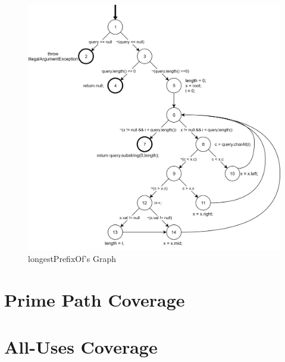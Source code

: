 \documentclass[12pt]{article}
\begin{document}
\begin{figure}[htb]
  	\centering
  	\includegraphics[scale=0.15]{longestPrefixOfGraph.png}
  	\caption{longestPrefixOf's Graph}
\end{figure}


\section{Prime Path Coverage}



\section{All-Uses Coverage }
\end{document}
